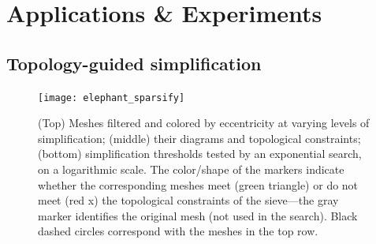 \documentclass[10pt]{article}
\numberwithin{equation}{section}
\newcommand{\+}{%
	\raisebox{0.18ex}{\scaleobj{0.55}{+}}
}
\newtheorem{corollary}{Corollary}
\theoremstyle{definition}
\theoremstyle{definition}
\begin{document}





\newpage

\newpage

\section{Applications \& Experiments}\label{sec:applications}





\subsection{Topology-guided simplification}
\begin{figure}[t]
	\texttt{[image: elephant\_sparsify]}
	\caption{(Top) Meshes filtered and colored by eccentricity at varying levels of simplification; (middle) their diagrams and topological constraints; (bottom) simplification thresholds tested by an exponential search, on a logarithmic scale. The color/shape of the markers indicate whether the corresponding meshes meet (green triangle) or do not meet (red x) the topological constraints of the sieve---the gray marker identifies the original mesh (not used in the search). Black dashed circles correspond with the meshes in the top row. }
\end{figure}
\end{document}
